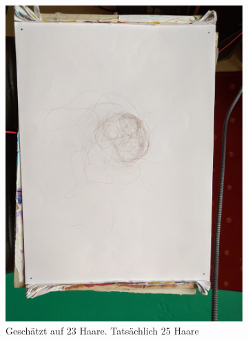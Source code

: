 \documentclass[german,a4paper,12pt]{llncs}
\begin{document}
\begin{figure}
	\centering
	\begin{subfigure}[b]{0.475\textwidth}
		\centering
		\includegraphics[width=\textwidth]{testFig/M_IMG_20200308_142449_25.jpg}
		\caption[]{Geschätzt auf 23 Haare. Tatsächlich 25 Haare}
		\label{img:tstM1} 
	\end{subfigure}
	\hfill
	\begin{subfigure}[b]{0.475\textwidth} 
		\centering

\end{subfigure}
\end{figure}
\end{document}
